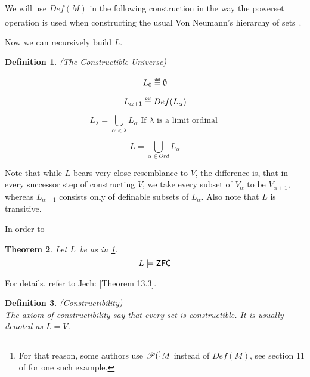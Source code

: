 \documentclass[12pt,a4paper]{article}
\newtheorem{theorem}{Theorem}[section]
\newtheorem{definition}[theorem]{Definition}
\newcommand{\power}[1]{\ensuremath{\mathscr{P}} (#1)}
\newcommand{\bce}{\begin{compactenum}}
\newcommand{\ece}{\end{compactenum}}
\newcommand\defeq{\mathrel{\overset{\makebox[0pt]{\mbox{\normalfont\tiny\sffamily def}}}{=}}}
\begin{document}
We will use $Def(M)$ in the following construction in the way the powerset operation is used when constructing the usual Von Neumann's hierarchy of sets\footnote{For that reason, some authors use $\power^{\*}{M}$ instead of $Def(M)$, see section 11 of \cite{PinterBook} for one such example.}.

Now we can recursively build $L$.
\begin{definition}{(The Constructible Universe)}\label{def:constructible_universe}\\
\bce[(i)]
\item
\begin{equation}
L_0 \defeq  \emptyset
\end{equation}

\item
\begin{equation}
L_{\alpha+1} \defeq  Def(L_{\alpha})
\end{equation}
\item
\begin{equation}
L_{\lambda} = \bigcup_{\alpha < \lambda} L_{\alpha}\mbox{ If }\lambda\mbox{ is a~limit ordinal }
\end{equation}
\item
\begin{equation}\label{eq:def_l}
L = \bigcup_{\alpha\in Ord} L_{\alpha}
\end{equation}
\ece
\end{definition}

Note that while $L$ bears very close resemblance to $V$, the difference is, that in every successor step of constructing $V$, we take every subset of $V_\alpha$ to be $V_{\alpha+1}$, whereas $L_{\alpha+1}$ consists only of definable subsets of $L_\alpha$. Also note that $L$ is transitive.

In order to 

\begin{theorem}
Let $L$ be as in \ref{def:constructible_universe}.
\begin{equation}
L \models \sf{ZFC}
\end{equation}
\end{theorem}
For details, refer to Jech: \cite{JechBook}[Theorem 13.3].

\begin{definition}{(Constructibility)}\\
The axiom of constructibility say that every set is constructible. It is usually denoted as $L = V$.
\end{definition}
\end{document}
